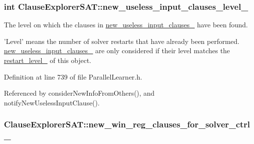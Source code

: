 \hypertarget{classClauseExplorerSAT_a67eeafbba9da9c87534f7ef26531a57a}{
\subsubsection[{new\-\_\-useless\-\_\-input\-\_\-clauses\-\_\-level\-\_\-}]{\setlength{\rightskip}{0pt plus 5cm}int Clause\-Explorer\-S\-A\-T\-::new\-\_\-useless\-\_\-input\-\_\-clauses\-\_\-level\-\_\-\hspace{0.3cm}{\ttfamily [protected]}}}\label{classClauseExplorerSAT_a67eeafbba9da9c87534f7ef26531a57a}


The level on which the clauses in \hyperlink{classClauseExplorerSAT_a3d1bdb9a6484c85af655a4eed1ee5f19}{new\-\_\-useless\-\_\-input\-\_\-clauses\-\_\-} have been found. 

'Level' means the number of solver restarts that have already been performed. \hyperlink{classClauseExplorerSAT_a3d1bdb9a6484c85af655a4eed1ee5f19}{new\-\_\-useless\-\_\-input\-\_\-clauses\-\_\-} are only considered if their level matches the \hyperlink{classClauseExplorerSAT_a0b5d716111026dd1cb4efe5855e2fe2f}{restart\-\_\-level\-\_\-} of this object. 

Definition at line 739 of file Parallel\-Learner.\-h.



Referenced by consider\-New\-Info\-From\-Others(), and notify\-New\-Useless\-Input\-Clause().

\hypertarget{classClauseExplorerSAT_a7d923928f3cb6209b29f5cc5104b5fe2}{
\subsubsection[{new\-\_\-win\-\_\-reg\-\_\-clauses\-\_\-for\-\_\-solver\-\_\-ctrl\-\_\-}]{ Clause\-Explorer\-S\-A\-T\-::new\-\_\-win\-\_\-reg\-\_\-clauses\-\_\-for\-\_\-solver\-\_\-ctrl\-\_\-\hspace{0.3cm}{\ttfamily [protected]}}}\label{classClauseExplorerSAT_a7d923928f3cb6209b29f5cc5104b5fe2}



